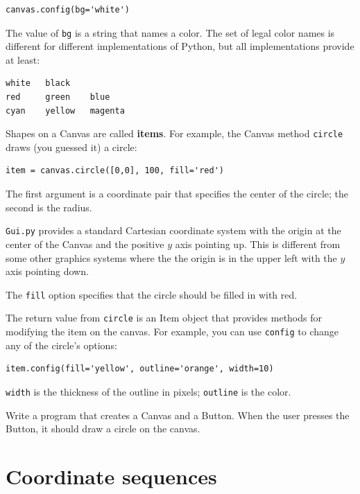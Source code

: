 \documentclass[10pt]{book}
\begin{document}
\beforeverb
\begin{verbatim}
canvas.config(bg='white')
\end{verbatim}
\afterverb
%
The value of {\tt bg} is a string
that names a color.  The set of legal color names is different
for different implementations of Python, but all implementations
provide at least:

\beforeverb
\begin{verbatim}
white   black
red     green    blue   
cyan    yellow   magenta
\end{verbatim}
\afterverb
%
Shapes on a Canvas are called {\bf items}.  For example,
the Canvas method {\tt circle} draws (you guessed it) a circle:


\beforeverb
\begin{verbatim}
item = canvas.circle([0,0], 100, fill='red')
\end{verbatim}
\afterverb
%
The first argument is a coordinate pair that specifies the
center of the circle; the second is the radius.


{\tt Gui.py} provides a standard Cartesian coordinate system with
the origin at the center of the Canvas and the positive $y$ axis
pointing up.  This is different from some other graphics systems
where the the origin is in the upper left with the $y$ axis
pointing down.

The {\tt fill} option specifies that the circle should be filled
in with red.

The return value from {\tt circle} is an Item object that
provides methods for modifying the item on the canvas.  For
example, you can use {\tt config} to change any of the circle's
options:

\beforeverb
\begin{verbatim}
item.config(fill='yellow', outline='orange', width=10)
\end{verbatim}
\afterverb
%
{\tt width} is the thickness of the outline in pixels;
{\tt outline} is the color.

\begin{ex}
\label{circle}
Write a program that creates a Canvas and a Button.  When the
user presses the Button, it should draw a circle on the canvas.
\end{ex}


\section{Coordinate sequences}
\end{document}
